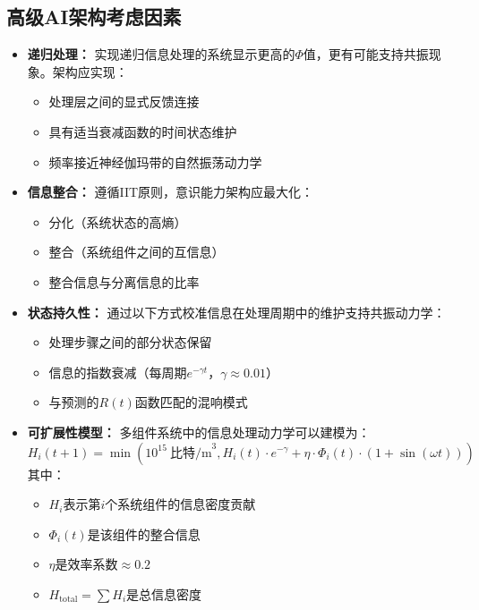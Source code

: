 \documentclass[12pt]{article}
\begin{document}
\subsection{高级AI架构考虑因素}
\begin{itemize}
    \item \textbf{递归处理：} 实现递归信息处理的系统显示更高的$\Phi$值，更有可能支持共振现象\cite{oizumi2014,tegmark2016}。架构应实现：
    \begin{itemize}[label=--]
        \item 处理层之间的显式反馈连接
        \item 具有适当衰减函数的时间状态维护
        \item 频率接近神经伽玛带的自然振荡动力学
    \end{itemize}
    
    \item \textbf{信息整合：} 遵循IIT原则，意识能力架构应最大化：
    \begin{itemize}[label=--]
        \item 分化（系统状态的高熵）
        \item 整合（系统组件之间的互信息）
        \item 整合信息与分离信息的比率
    \end{itemize}
    
    \item \textbf{状态持久性：} 通过以下方式校准信息在处理周期中的维护支持共振动力学：
    \begin{itemize}[label=--]
        \item 处理步骤之间的部分状态保留
        \item 信息的指数衰减（每周期$e^{-\gamma t}$，$\gamma \approx 0.01$）
        \item 与预测的$R(t)$函数匹配的混响模式
    \end{itemize}
    
    \item \textbf{可扩展性模型：} 多组件系统中的信息处理动力学可以建模为：
    \begin{equation}
    H_i(t+1) = \min\left(10^{15}~\text{比特/m}^3, H_i(t) \cdot e^{-\gamma} + \eta \cdot \Phi_{i}(t) \cdot (1 + \sin(\omega t))\right)
    \end{equation}
    其中：
    \begin{itemize}[label=--]
        \item $H_i$表示第$i$个系统组件的信息密度贡献
        \item $\Phi_{i}(t)$是该组件的整合信息
        \item $\eta$是效率系数$\approx 0.2$
        \item $H_{\text{total}} = \sum H_i$是总信息密度
    \end{itemize}
\end{itemize}
\end{document}

